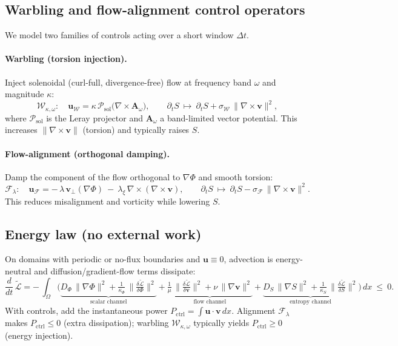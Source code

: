 \documentclass[a4paper,11pt]{article}
\begin{document}
\subsection{Warbling and flow-alignment control operators}
We model two families of controls acting over a short window \(\Delta t\).

\paragraph{Warbling (torsion injection).}
Inject solenoidal (curl-full, divergence-free) flow at frequency band
\(\omega\) and magnitude \(\kappa\):
\begin{equation}
\label{eq:warble}
\mathcal{W}_{\kappa,\omega}:\quad
\mathbf{u}_{\mathcal{W}}
=
\kappa\,\mathcal{P}_{\mathrm{sol}}\big(\nabla\times \mathbf{A}_\omega\big),
\qquad
\partial_t S\ \mapsto\ \partial_t S + \sigma_\mathcal{W}\,\|\nabla\times \mathbf{v}\|^2,
\end{equation}
where \(\mathcal{P}_{\mathrm{sol}}\) is the Leray projector and \(\mathbf{A}_\omega\) a band-limited
vector potential. This increases \(\|\nabla\times \mathbf{v}\|\) (torsion) and
typically raises \(S\).

\paragraph{Flow-alignment (orthogonal damping).}
Damp the component of the flow orthogonal to \(\nabla\Phi\) and smooth torsion:
\begin{equation}
\label{eq:align}
\mathcal{F}_{\lambda}:\quad
\mathbf{u}_{\mathcal{F}}
=
-\,\lambda\,\mathbf{v}_\perp(\nabla\Phi)\ -\ \lambda_\xi\,\nabla\times(\nabla\times \mathbf{v}),
\qquad
\partial_t S\ \mapsto\ \partial_t S - \sigma_\mathcal{F}\,\|\nabla\times \mathbf{v}\|^2.
\end{equation}
This reduces misalignment and vorticity while lowering \(S\).

\subsection{Energy law (no external work)}
On domains with periodic or no-flux boundaries and \(\mathbf{u}\equiv 0\),
advection is energy-neutral and diffusion/gradient-flow terms dissipate:
\begin{equation}
\label{eq:energy-law}
\frac{d}{dt}\,\widetilde{\mathcal{L}}
=
-\,\int_\Omega
\Big(
\underbrace{D_\Phi\,\|\nabla \Phi\|^2 + \tfrac{1}{\kappa_\Phi}\,\big\|\tfrac{\delta \widetilde{\mathcal{L}}}{\delta \Phi}\big\|^2}_{\text{scalar channel}}
+
\underbrace{\tfrac{1}{\mu}\,\big\|\tfrac{\delta \widetilde{\mathcal{L}}}{\delta \mathbf{v}}\big\|^2
+\nu\,\|\nabla \mathbf{v}\|^2}_{\text{flow channel}}
+
\underbrace{D_S\,\|\nabla S\|^2+\tfrac{1}{\kappa_S}\,\big\|\tfrac{\delta \widetilde{\mathcal{L}}}{\delta S}\big\|^2}_{\text{entropy channel}}
\Big)\,dx\ \le\ 0.
\end{equation}
With controls, add the instantaneous power \(P_{\mathrm{ctrl}}=\int \mathbf{u}\!\cdot\!\mathbf{v}\,dx\).
Alignment \(\mathcal{F}_\lambda\) makes \(P_{\mathrm{ctrl}}\le 0\) (extra dissipation); warbling
\(\mathcal{W}_{\kappa,\omega}\) typically yields \(P_{\mathrm{ctrl}}\ge 0\) (energy injection).
\end{document}
